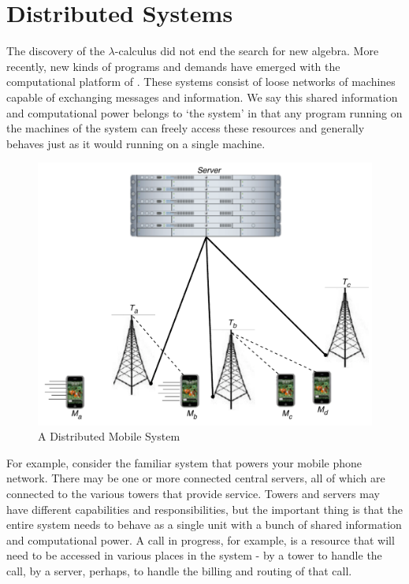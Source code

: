 \section{Distributed Systems}
The discovery of the $\lambda$-calculus did not end the search for new algebra.  
More recently, new kinds of programs and demands have emerged with the computational platform of .  
These systems consist of loose networks of machines capable of exchanging messages and information.  
We say this shared information and computational power belongs to `the system' in that any program running on the machines of the system can freely access these resources and generally behaves just as it would running on a single machine.
\begin{figure}[H]
\centering
\includegraphics[scale=0.7]{figures/cell_network.pdf} %
\caption{A Distributed Mobile System}
\label{fig_cell_network}
\end{figure}

For example, consider the familiar system that powers your mobile phone network.  
There may be one or more connected central servers, all of which are connected to the various towers that provide service.  
Towers and servers may have different capabilities and responsibilities, but the important thing is that the entire system needs to behave as a single unit with a bunch of shared information and computational power.  
A call in progress, for example, is a resource that will need to be accessed in various places in the system - by a tower to handle the call, by a server, perhaps, to handle the billing and routing of that call.  

